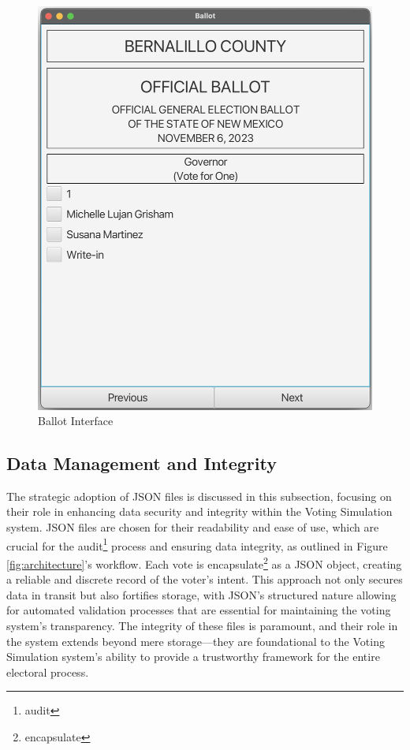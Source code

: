 \documentclass{article}
\begin{document}
\begin{figure}[h]
\begin{minipage}[b]{0.4\textwidth}
    \includegraphics[width=\textwidth]{docs/sad/figures/ballot.png}
    \caption{Ballot Interface}
    \label{fig:ballot}
  \end{minipage}
\end{figure}

\subsection{Data Management and Integrity}
The strategic adoption of JSON files is discussed in this subsection, focusing on their role in enhancing data security and integrity within the Voting Simulation system. JSON files are chosen for their readability and ease of use, which are crucial for the \gls{audit}\footnote{\glsdesc{audit}} process and ensuring data integrity, as outlined in Figure \ref{fig:architecture}'s workflow. Each vote is \gls{encapsulate}\footnote{\glsdesc{encapsulate}} as a JSON object, creating a reliable and discrete record of the voter's intent. This approach not only secures data in transit but also fortifies storage, with JSON's structured nature allowing for automated validation processes that are essential for maintaining the voting system’s transparency. The integrity of these files is paramount, and their role in the system extends beyond mere storage—they are foundational to the Voting Simulation system's ability to provide a trustworthy framework for the entire electoral process.
\end{document}
